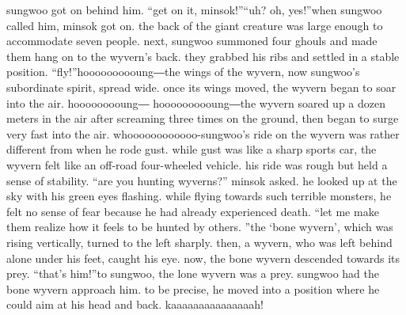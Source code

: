sungwoo got on behind him.
“get on it, minsok!”“uh? oh, yes!”when sungwoo called him, minsok got on.
 the back of the giant creature was large enough to accommodate seven people.
next, sungwoo summoned four ghouls and made them hang on to the wyvern’s back.
they grabbed his ribs and settled in a stable position.
“fly!”hoooooooooung―the wings of the wyvern, now sungwoo’s subordinate spirit, spread wide.
 once its wings moved, the wyvern began to soar into the air.
hooooooooung― hoooooooooung―the wyvern soared up a dozen meters in the air after screaming three times on the ground, then began to surge very fast into the air.
whoooooooooooo-sungwoo’s ride on the wyvern was rather different from when he rode gust.
 while gust was like a sharp sports car, the wyvern felt like an off-road four-wheeled vehicle.
 his ride was rough but held a sense of stability.
“are you hunting wyverns?” minsok asked.
he looked up at the sky with his green eyes flashing.
 while flying towards such terrible monsters, he felt no sense of fear because he had already experienced death.
“let me make them realize how it feels to be hunted by others.
”the ‘bone wyvern’, which was rising vertically, turned to the left sharply.
then, a wyvern, who was left behind alone under his feet, caught his eye.
 now, the bone wyvern descended towards its prey.
“that’s him!”to sungwoo, the lone wyvern was a prey.
 sungwoo had the bone wyvern approach him.
 to be precise, he moved into a position where he could aim at his head and back.
kaaaaaaaaaaaaaaah!

 